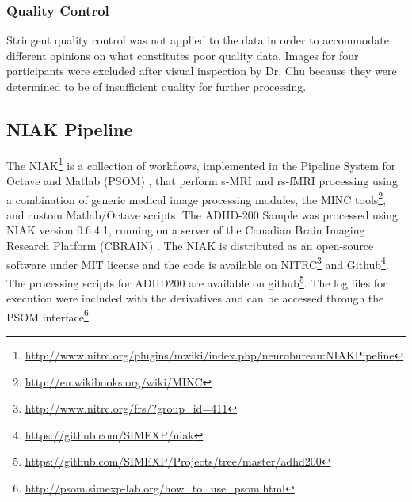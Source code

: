\documentclass[preprint,12pt,3p]{elsarticle}
\begin{document}
\subsubsection{Quality Control}
Stringent quality control was not applied to the data in order to accommodate different opinions on what constitutes poor quality data. Images for four participants were excluded after visual inspection by Dr. Chu because they were determined to be of insufficient quality for further processing.

\subsection{NIAK Pipeline}
The NIAK\footnote{\url{http://www.nitrc.org/plugins/mwiki/index.php/neurobureau:NIAKPipeline}} is a collection of workflows, implemented in the Pipeline System for Octave and Matlab (PSOM) \cite{Bellec2012}, that perform s-MRI and rs-fMRI processing using a combination of generic medical image processing modules, the MINC tools\footnote{\url{http://en.wikibooks.org/wiki/MINC}}, and custom Matlab/Octave scripts. The ADHD-200 Sample was processed using NIAK version 0.6.4.1, running on a server of the Canadian Brain Imaging Research Platform (CBRAIN) \cite{sherif2014cbrain}. The NIAK is distributed as an open-source software under MIT license and the code is available on NITRC\footnote{\url{http://www.nitrc.org/frs/?group_id=411}} and Github\footnote{\url{https://github.com/SIMEXP/niak}}. The processing scripts for ADHD200 are available on github\footnote{\url{https://github.com/SIMEXP/Projects/tree/master/adhd200}}. 
The log files for execution were included with the derivatives and can be accessed through the PSOM interface\footnote{\url{http://psom.simexp-lab.org/how_to_use_psom.html}}.
\end{document}

